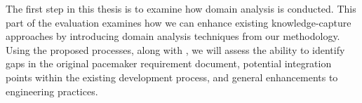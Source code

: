%

The first step in this thesis is to examine how domain analysis is conducted. This part of the evaluation examines how we can enhance existing knowledge-capture approaches by introducing domain analysis techniques from our methodology. Using the proposed processes, along with \tool, we will assess the ability to identify gaps in the original pacemaker requirement document, potential integration points within the existing development process, and general enhancements to engineering practices.

